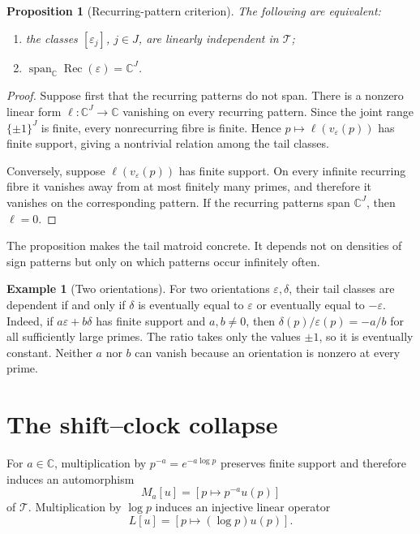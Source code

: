 \documentclass[11pt]{article}
\newtheorem{proposition}[theorem]{Proposition}
\theoremstyle{definition}
\newtheorem{example}[theorem]{Example}
\theoremstyle{remark}
\newcommand{\C}{\mathbb C}
\newcommand{\cT}{\mathcal T}
\newcommand{\Span}{\operatorname{span}}
\begin{document}
\begin{proposition}[Recurring-pattern criterion]\label{prop:recurring-pattern}
The following are equivalent:
\begin{enumerate}[label=\textup{(\roman*)},leftmargin=2.2em]
  \item the classes \([\varepsilon_j]\), \(j\in J\), are linearly independent in
  \(\cT\);
  \item \(\Span_\C\operatorname{Rec}(\varepsilon)=\C^J\).
\end{enumerate}
\end{proposition}

\begin{proof}
Suppose first that the recurring patterns do not span.  There is a nonzero linear form
\(\ell:\C^J\to\C\) vanishing on every recurring pattern.  Since the joint range
\(\{\pm1\}^{J}\) is finite, every nonrecurring fibre is finite.  Hence
\(p\mapsto\ell(v_\varepsilon(p))\) has finite support, giving a nontrivial relation among
the tail classes.

Conversely, suppose \(\ell(v_\varepsilon(p))\) has finite support.  On every infinite
recurring fibre it vanishes away from at most finitely many primes, and therefore it vanishes on
the corresponding pattern.  If the recurring patterns span \(\C^J\), then \(\ell=0\).
\end{proof}

The proposition makes the tail matroid concrete.  It depends not on densities of sign patterns
but only on which patterns occur infinitely often.

\begin{example}[Two orientations]\label{ex:two-orientations}
For two orientations \(\varepsilon,\delta\), their tail classes are dependent if and only if
\(\delta\) is eventually equal to \(\varepsilon\) or eventually equal to
\(-\varepsilon\).  Indeed, if
\(a\varepsilon+b\delta\) has finite support and \(a,b\neq0\), then
\(\delta(p)/\varepsilon(p)=-a/b\) for all sufficiently large primes.  The ratio takes only the
values \(\pm1\), so it is eventually constant.  Neither \(a\) nor \(b\) can vanish because an
orientation is nonzero at every prime.
\end{example}

\section{The shift--clock collapse}\label{sec:operator}

For \(a\in\C\), multiplication by \(p^{-a}=e^{-a\log p}\) preserves finite support and
therefore induces an automorphism
\[
  M_a[u]=[p\mapsto p^{-a}u(p)]
\]
of \(\cT\).  Multiplication by \(\log p\) induces an injective linear operator
\[
  L[u]=[p\mapsto(\log p)u(p)].
\]
\end{document}
